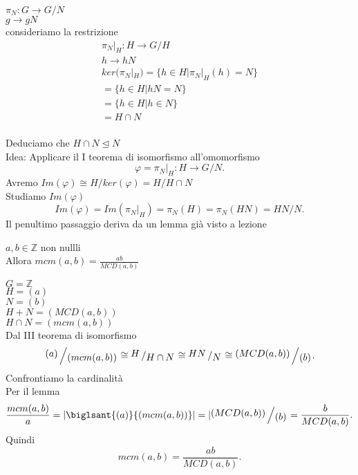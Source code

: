 \documentclass[12px]{article}
\begin{document}
		\begin{dimo}
			$\pi_N:G \rightarrow G/N$\\
			$g \rightarrow gN$\\
			consideriamo la restrizione\\
			\begin{gather*}
				\pi_N|_H:H \rightarrow G/H\\
				h \rightarrow hN\\
				ker (\pi_N|_H) = \{h\in H| \pi_N|_H(h) = N\}\\
					       =\{h\in H|hN = N\}\\
					       =\{h\in H| h\in N\}\\
					       =H\cap N
			\end{gather*}\\
			Deduciamo che $H\cap N\trianglelefteq N$\\
			Idea: Applicare il I teorema di isomorfismo all'omomorfismo
			 \[
			\varphi=\pi_N|_H:H \rightarrow G/N
			.\] 
			Avremo $Im( \varphi)\cong H/ker( \varphi) = H/H\cap N$\\
			Studiamo $Im( \varphi)$\\
	\[
	Im( \varphi) = Im( \pi_N|_H) = \pi_N(H) = \pi_N(HN) = HN/N
	.\] 
	Il penultimo passaggio deriva da un lemma già visto a lezione
		\end{dimo}
		\begin{coro}
			$a,b\in \mathbb Z$ non nullli\\
			Allora $mcm(a,b) = \frac {ab} {MCD(a,b)}$
		\end{coro}
		\begin{dimo}
			$G = \mathbb Z$ \\
			$H = (a)$\\
			 $N= (b)$\\
			  $H+N = (MCD(a,b))$\\
			   $H\cap N = (mcm(a,b))$\\
		Dal III teorema di isomorfismo 
		 \[
			 \bigslant{(a)}{(mcm(a,b))}\cong \bigslant H {H\cap N}\cong \bigslant {HN} N \cong \bigslant{(MCD(a,b))}{(b)}
		.\] 
		Confrontiamo la cardinalità\\
		Per il lemma\\
		\[
			\frac {mcm(a,b)}{a} = |\biglsant {(a)}{(mcm(a,b))}| = |\bigslant {(MCD(a,b))}{(b)} = \frac {b}{MCD(a,b)}
		.\] 
		Quindi 
		\[
			mcm(a,b) = \frac {ab}{MCD(a,b)}
		.\] 
		\end{dimo}
\end{document}
